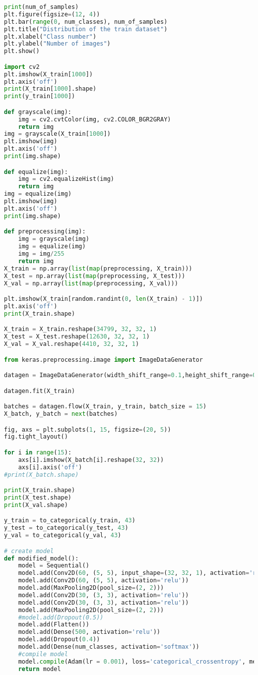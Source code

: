 \begin{lstlisting}[language=Python]
print(num_of_samples)
plt.figure(figsize=(12, 4))
plt.bar(range(0, num_classes), num_of_samples)
plt.title("Distribution of the train dataset")
plt.xlabel("Class number")
plt.ylabel("Number of images")
plt.show()

import cv2
plt.imshow(X_train[1000])
plt.axis('off')
print(X_train[1000].shape)
print(y_train[1000])

def grayscale(img):
	img = cv2.cvtColor(img, cv2.COLOR_BGR2GRAY)
	return img	
img = grayscale(X_train[1000])
plt.imshow(img)
plt.axis('off')
print(img.shape)

def equalize(img):
	img = cv2.equalizeHist(img)
	return img
img = equalize(img)
plt.imshow(img)
plt.axis('off')
print(img.shape)

def preprocessing(img):
	img = grayscale(img)
	img = equalize(img)
	img = img/255
	return img
X_train = np.array(list(map(preprocessing, X_train)))
X_test = np.array(list(map(preprocessing, X_test)))
X_val = np.array(list(map(preprocessing, X_val)))

plt.imshow(X_train[random.randint(0, len(X_train) - 1)])
plt.axis('off')
print(X_train.shape)

X_train = X_train.reshape(34799, 32, 32, 1)
X_test = X_test.reshape(12630, 32, 32, 1)
X_val = X_val.reshape(4410, 32, 32, 1)

from keras.preprocessing.image import ImageDataGenerator

datagen = ImageDataGenerator(width_shift_range=0.1,height_shift_range=0.1,zoom_range=0.2,shear_range=0.1,rotation_range=10.)

datagen.fit(X_train)

batches = datagen.flow(X_train, y_train, batch_size = 15)
X_batch, y_batch = next(batches)

fig, axs = plt.subplots(1, 15, figsize=(20, 5))
fig.tight_layout()

for i in range(15):
	axs[i].imshow(X_batch[i].reshape(32, 32))
	axs[i].axis('off')
#print(X_batch.shape)

print(X_train.shape)
print(X_test.shape)
print(X_val.shape)

y_train = to_categorical(y_train, 43)
y_test = to_categorical(y_test, 43)
y_val = to_categorical(y_val, 43)

# create model
def modified_model():
	model = Sequential()
	model.add(Conv2D(60, (5, 5), input_shape=(32, 32, 1), activation='relu'))
	model.add(Conv2D(60, (5, 5), activation='relu'))
	model.add(MaxPooling2D(pool_size=(2, 2)))
	model.add(Conv2D(30, (3, 3), activation='relu'))
	model.add(Conv2D(30, (3, 3), activation='relu'))
	model.add(MaxPooling2D(pool_size=(2, 2)))
	#model.add(Dropout(0.5))
	model.add(Flatten())
	model.add(Dense(500, activation='relu'))
	model.add(Dropout(0.4))
	model.add(Dense(num_classes, activation='softmax'))
	#compile model
	model.compile(Adam(lr = 0.001), loss='categorical_crossentropy', metrics=['accuracy'])
	return model
	

\end{lstlisting}
